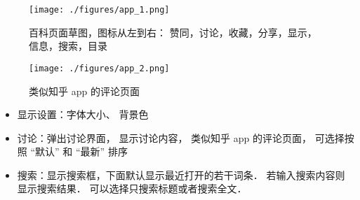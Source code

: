 
\begin{figure}[ht]
\centering
\texttt{[image: ./figures/app\_1.png]}
\caption{百科页面草图，图标从左到右： 赞同，讨论，收藏，分享，显示，信息，搜索，目录}\label{app_fig1}
\end{figure}

\begin{figure}[ht]
\centering
\texttt{[image: ./figures/app\_2.png]}
\caption{类似知乎 app 的评论页面} \label{app_fig2}
\end{figure}

\begin{itemize}
\item 显示设置：字体大小、 背景色
\item 讨论：弹出讨论界面， 显示讨论内容， 类似知乎 app 的评论页面， 可选择按照 “默认” 和 “最新” 排序
\item 搜索：显示搜索框，下面默认显示最近打开的若干词条． 若输入搜索内容则显示搜索结果． 可以选择只搜索标题或者搜索全文．
\end{itemize}
